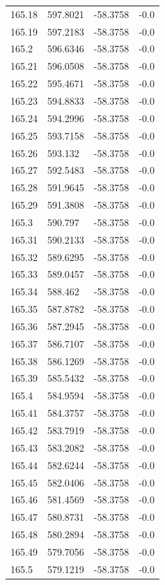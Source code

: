 \begin{table}[H]
\begin{tabular}{llll}
165.18 & 597.8021 & -58.3758 & -0.0 \\
165.19 & 597.2183 & -58.3758 & -0.0 \\
165.2 & 596.6346 & -58.3758 & -0.0 \\
165.21 & 596.0508 & -58.3758 & -0.0 \\
165.22 & 595.4671 & -58.3758 & -0.0 \\
165.23 & 594.8833 & -58.3758 & -0.0 \\
165.24 & 594.2996 & -58.3758 & -0.0 \\
165.25 & 593.7158 & -58.3758 & -0.0 \\
165.26 & 593.132 & -58.3758 & -0.0 \\
165.27 & 592.5483 & -58.3758 & -0.0 \\
165.28 & 591.9645 & -58.3758 & -0.0 \\
165.29 & 591.3808 & -58.3758 & -0.0 \\
165.3 & 590.797 & -58.3758 & -0.0 \\
165.31 & 590.2133 & -58.3758 & -0.0 \\
165.32 & 589.6295 & -58.3758 & -0.0 \\
165.33 & 589.0457 & -58.3758 & -0.0 \\
165.34 & 588.462 & -58.3758 & -0.0 \\
165.35 & 587.8782 & -58.3758 & -0.0 \\
165.36 & 587.2945 & -58.3758 & -0.0 \\
165.37 & 586.7107 & -58.3758 & -0.0 \\
165.38 & 586.1269 & -58.3758 & -0.0 \\
165.39 & 585.5432 & -58.3758 & -0.0 \\
165.4 & 584.9594 & -58.3758 & -0.0 \\
165.41 & 584.3757 & -58.3758 & -0.0 \\
165.42 & 583.7919 & -58.3758 & -0.0 \\
165.43 & 583.2082 & -58.3758 & -0.0 \\
165.44 & 582.6244 & -58.3758 & -0.0 \\
165.45 & 582.0406 & -58.3758 & -0.0 \\
165.46 & 581.4569 & -58.3758 & -0.0 \\
165.47 & 580.8731 & -58.3758 & -0.0 \\
165.48 & 580.2894 & -58.3758 & -0.0 \\
165.49 & 579.7056 & -58.3758 & -0.0 \\
165.5 & 579.1219 & -58.3758 & -0.0 \\

\end{tabular}
\end{table}
